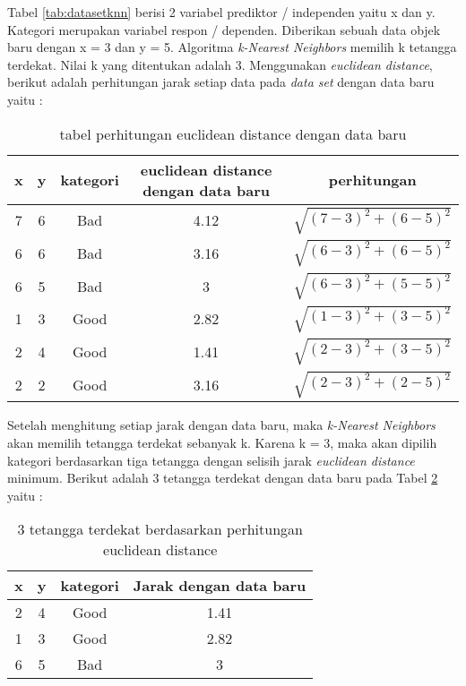  Tabel \ref{tab:datasetknn} berisi 2 variabel prediktor / independen yaitu x dan y. Kategori merupakan variabel respon / dependen. Diberikan sebuah data objek baru dengan x = 3 dan y = 5. Algoritma \textit{k-Nearest Neighbors}  memilih k tetangga terdekat.  Nilai k yang ditentukan adalah 3. Menggunakan \textit{euclidean distance}, berikut adalah perhitungan jarak setiap data pada \textit{data set}  dengan data baru yaitu : 
 
 \begin{table}[ht]
 \centering
\begin{tabular}{|c|c|c|c|c|}
 \hline 
 x & y & kategori & euclidean distance dengan data baru & perhitungan \\ 
 \hline 
 7 & 6 & Bad & 4.12 & $\sqrt{(7-3)^2+(6-5)^2}$ \\ 
 \hline 
 6 & 6 & Bad & 3.16 & $\sqrt{(6-3)^2+(6-5)^2}$ \\ 
 \hline 
 6 & 5 & Bad & 3 & $\sqrt{(6-3)^2+(5-5)^2}$ \\ 
 \hline 
 1 & 3 & Good & 2.82 & $\sqrt{(1-3)^2+(3-5)^2}$ \\ 
 \hline 
 2 & 4 & Good & 1.41 & $\sqrt{(2-3)^2+(3-5)^2}$ \\ 
 \hline 
 2 & 2 & Good & 3.16 & $\sqrt{(2-3)^2+(2-5)^2}$ \\ 
 \hline 
 \end{tabular}  
 \caption{tabel perhitungan euclidean distance dengan data baru}
 \label{tab:hitunganeuclideandistanceknn}
  \end{table}
  
Setelah menghitung setiap jarak dengan data baru, maka \textit{k-Nearest Neighbors} akan memilih tetangga terdekat sebanyak k. Karena k = 3, maka akan dipilih kategori berdasarkan tiga tetangga dengan selisih jarak \textit{euclidean distance} minimum. Berikut adalah 3 tetangga terdekat dengan data baru pada Tabel \ref{tab:tabel3tetangga} yaitu : 

\begin{table}[ht]
\centering
\begin{tabular}{|c|c|c|c|}
\hline 
x & y & kategori & Jarak dengan data baru \\ 
\hline 
2 & 4 & Good & 1.41 \\ 
\hline 
1 & 3 & Good & 2.82 \\ 
\hline 
6 & 5 & Bad & 3 \\ 
\hline 
\end{tabular} 
\caption{3 tetangga terdekat berdasarkan perhitungan euclidean distance}
\label{tab:tabel3tetangga}
 \end{table}

